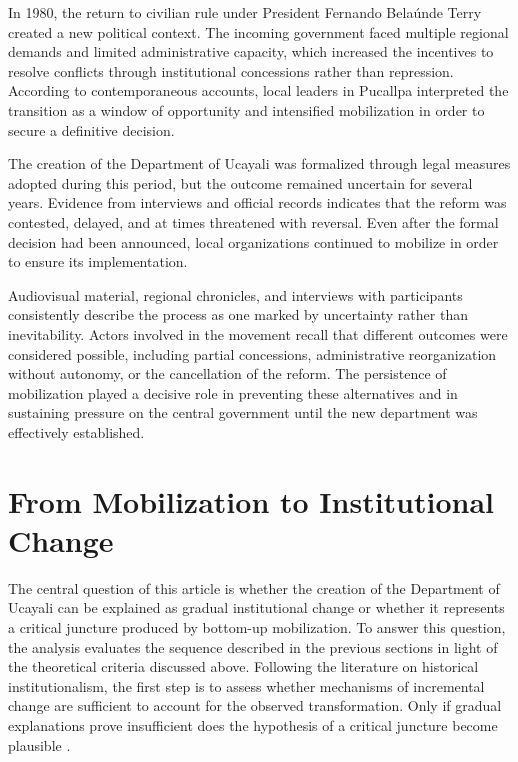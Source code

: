 \documentclass[12pt]{article}
\begin{document}
In 1980, the return to civilian rule under President Fernando Belaúnde
Terry created a new political context. The incoming government faced
multiple regional demands and limited administrative capacity, which
increased the incentives to resolve conflicts through institutional
concessions rather than repression. According to contemporaneous accounts,
local leaders in Pucallpa interpreted the transition as a window of
opportunity and intensified mobilization in order to secure a definitive
decision.

The creation of the Department of Ucayali was formalized through legal
measures adopted during this period, but the outcome remained uncertain
for several years. Evidence from interviews and official records indicates
that the reform was contested, delayed, and at times threatened with
reversal. Even after the formal decision had been announced, local
organizations continued to mobilize in order to ensure its
implementation.

Audiovisual material, regional chronicles, and interviews with
participants consistently describe the process as one marked by
uncertainty rather than inevitability. Actors involved in the movement
recall that different outcomes were considered possible, including partial
concessions, administrative reorganization without autonomy, or the
cancellation of the reform. The persistence of mobilization played a
decisive role in preventing these alternatives and in sustaining pressure
on the central government until the new department was effectively
established.

\section{From Mobilization to Institutional Change}

The central question of this article is whether the creation of the
Department of Ucayali can be explained as gradual institutional change
or whether it represents a critical juncture produced by bottom-up
mobilization. To answer this question, the analysis evaluates the
sequence described in the previous sections in light of the theoretical
criteria discussed above. Following the literature on historical
institutionalism, the first step is to assess whether mechanisms of
incremental change are sufficient to account for the observed
transformation. Only if gradual explanations prove insufficient does
the hypothesis of a critical juncture become plausible
\autocite{streeck_introduction_2005,mahoney_explaining_2010}.
\end{document}
